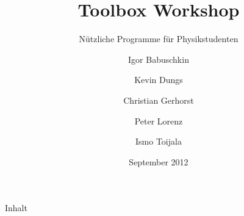 \documentclass[t]{beamer}
\title{Toolbox Workshop}
\subtitle{Nützliche Programme für Physikstudenten}
\author[Igor B.\and Kevin D.\and Christian G.\and Peter L.\and Ismo T.]{
       Igor Babuschkin%
  \and Kevin Dungs%
  \and Christian Gerhorst%
  \and Peter Lorenz%
  \and Ismo Toijala%
}
\institute[PeP et al. e.V.]{PeP et al. e.V.\thanks{\href{http://pep-dortmund.org}{pep-dortmund.org}}}
\date{September 2012}
\begin{document}
  {
    \begin{frame}
      \titlepage
    \end{frame}
  }

  \begin{frame}{Inhalt}
    \tableofcontents
  \end{frame}

  
  
  
\end{document}
